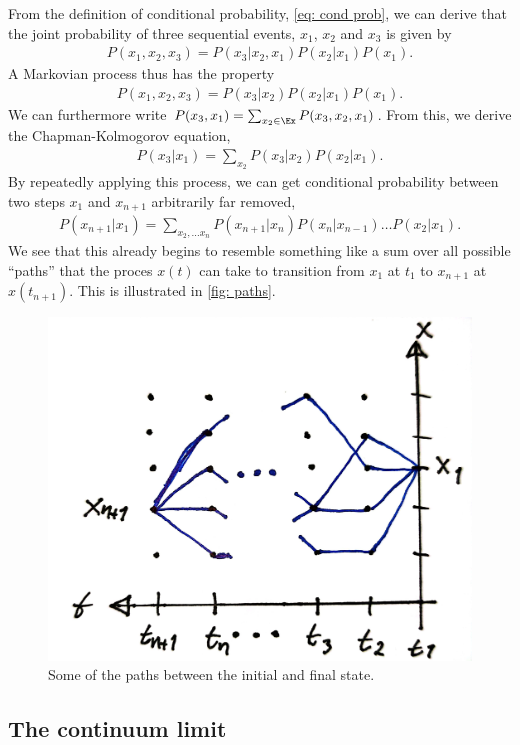 From the definition of conditional probability, \autoref{eq: cond prob}, we can derive that the joint probability of three sequential events, $x_1$, $x_2$ and $x_3$ is given by
%
\begin{align}
    P(x_1, x_2, x_3) = P(x_3|x_2,x_1)P(x_2|x_1)P(x_1).
\end{align}
%
A Markovian process thus has the property
%
\begin{align}
    P(x_1, x_2, x_3) = P(x_3|x_2)P(x_2|x_1)P(x_1).
\end{align}
%
We can furthermore write $P(x_3, x_1) = \sum_{x_2 \in \Ex} P(x_3, x_2, x_1)$.
From this, we derive the Chapman-Kolmogorov equation,
%
\begin{align}\label{eq: chapman kolmogorov}
    P(x_3|x_1) = \sum_{x_2} P(x_3|x_2) P(x_2|x_1).
\end{align}
%
By repeatedly applying this process, we can get conditional probability between two steps $x_1$ and $x_{n+1}$ arbitrarily far removed,
%
\begin{align}\label{eq: cond prob markov x0 given xn}
    P(x_{n+1}|x_1) 
    = \sum_{ x_2, \dots x_n}
    P(x_{n+1}|x_n) P(x_n| x_{n-1})\dots P(x_2|x_1).
\end{align}
%
We see that this already begins to resemble something like a sum over all possible ``paths'' that the proces $x(t)$ can take to transition from $x_1$ at $t_1$ to $x_{n+1}$ at $x(t_{n+1})$.
This is illustrated in \autoref{fig: paths}.


\begin{figure}[!htb]
    \centering
    \includegraphics[width=.4\textwidth]{fig/fig2.jpg}
    \caption{Some of the paths between the initial and final state.}
    \label{fig: paths}
\end{figure}


\subsection*{The continuum limit}

